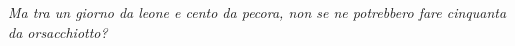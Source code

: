 \cleardoublepage
\thispagestyle{empty}
\begin{flushright}
\itshape Ma tra un giorno da leone e cento da pecora, non se ne potrebbero fare cinquanta da orsacchiotto?
\end{flushright}
\cleardoublepage